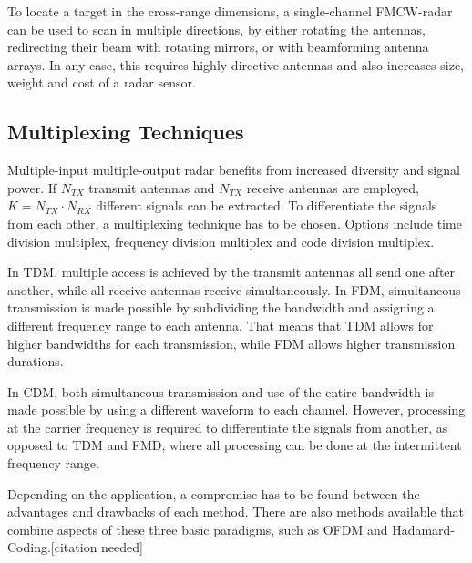 To locate a target in the cross-range dimensions,
a single-channel FMCW-radar can be used to scan in multiple directions,
by either rotating the antennas, redirecting their beam with rotating mirrors, or with beamforming antenna arrays.
In any case, this requires highly directive antennas and also increases size, weight and cost of a radar sensor.

\subsection{Multiplexing Techniques}
Multiple-input multiple-output radar benefits from increased diversity and signal power.
If $N_{TX}$ transmit antennas and $N_{TX}$ receive antennas are employed, $K=N_{TX} \cdot N_{RX}$ different signals can be extracted.
To differentiate the signals from each other, a multiplexing technique has to be chosen.
Options include time division multiplex, frequency division multiplex and code division multiplex.

In TDM, multiple access is achieved by the transmit antennas all send one after another,
while all receive antennas receive simultaneously.
In FDM, simultaneous transmission is made possible by subdividing the bandwidth and assigning a different frequency range to each antenna.
That means that TDM allows for higher bandwidths for each transmission, while FDM allows higher transmission durations.

In CDM, both simultaneous transmission and use of the entire bandwidth is made possible by using a different waveform to each channel.
However, processing at the carrier frequency is required to differentiate the signals from another, as opposed to TDM and FMD,
where all processing can be done at the intermittent frequency range.

Depending on the application, a compromise has to be found between the advantages and drawbacks of each method.
There are also methods available that combine aspects of these three basic paradigms, such as OFDM and Hadamard-Coding.[citation needed] \\

